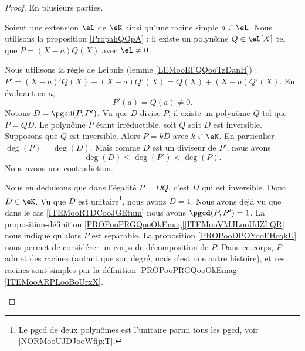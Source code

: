 \begin{proof}
	En plusieurs parties.
	\begin{subproof}
		Soient une extension \( \eL\) de \( \eK\) ainsi qu'une racine simple \( a\in \eL\). Nous utilisons la proposition \ref{PropahQQpA} : il existe un polynôme \( Q\in \eL[X]\) tel que \( P=(X-a)Q(X)\) avec \( \eL\neq 0\).

		Nous utilisons la règle de Leibniz (lemme \ref{LEMooEFQQooTzDanH}) : \( P'=(X-a)'Q(X)+(X-a)Q'(X)=Q(X)+(X-a)Q'(X)\). En évaluant en \( a\),
		\begin{equation}
			P'(a)=Q(a)\neq 0.
		\end{equation}
		\spitem[\ref{ITEMooRTDCooJGEtum} implique \( \pgcd(P,P')=1\)]
		Notons \( D=\pgcd(P,P')\). Vu que \( D\) divise \( P\), il existe un polynôme \( Q\) tel que \( P=QD\). Le polynôme \( P\) étant irréductible, soit \( Q\) soit \( D\) est inversible. Supposons que \( Q\) est inversible. Alors \( P=kD\) avec \( k\in \eK\). En particulier \( \deg(P)=\deg(D)\). Mais comme \( D\) est un diviseur de \( P'\), nous avons
		\begin{equation}
			\deg(D)\leq \deg(P')<\deg(P).
		\end{equation}
		Nous avons une contradiction.

		Nous en déduisons que dans l'égalité \( P=DQ\), c'est \( D\) qui est inversible. Donc \( D\in \eK\). Vu que \( D\) est unitaire\footnote{Le pgcd de deux polynômes est l'unitaire parmi tous les pgcd, voir \ref{NORMooUJDJooWfijxT}.}, nous avons \( D=1\).
		Nous avons déjà vu que dans le cas \ref{ITEMooRTDCooJGEtum} nous avons \( \pgcd(P,P')=1\). La proposition-définition \ref{PROPooPRGQooOkEmag}\ref{ITEMooVMJLooUdZLQR} nous indique qu'alors \( P\) est séparable.
		La proposition \ref{PROPooDPOYooFHcqkU} nous permet de considérer un corps de décomposition de \( P\). Dans ce corps, \( P\) admet des racines (autant que son degré, mais c'est une autre histoire), et ces racines sont simples par la définition \ref{PROPooPRGQooOkEmag}\ref{ITEMooARPLooBoUrxX}.
	\end{subproof}
\end{proof}

